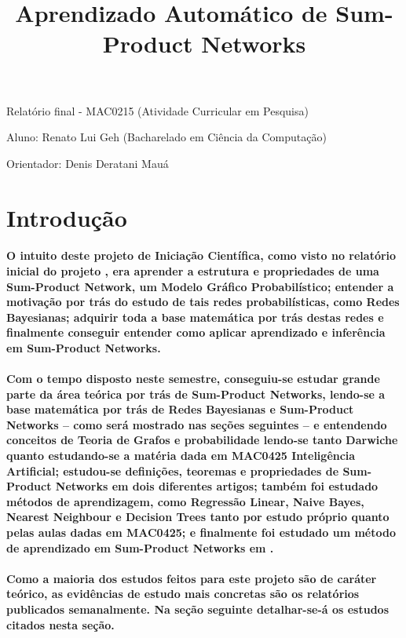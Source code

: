 \documentclass[a4paper,10pt]{article}
\title{\textbf{Aprendizado Automático de Sum-Product Networks}}
\theoremstyle{plain}
\begin{document}
\date{}
\author{}
\vspace*{-40pt}
{\let\newpage\relax\maketitle}

Relatório final - MAC0215 (Atividade Curricular em Pesquisa)

Aluno: Renato Lui Geh (Bacharelado em Ciência da Computação)

Orientador: Denis Deratani Mauá

\section{Introdução}

\paragraph{
  O intuito deste projeto de Iniciação Científica, como visto no relatório inicial do projeto
  \cite{project-def}, era aprender a estrutura e propriedades de uma Sum-Product Network, um Modelo
  Gráfico Probabilístico; entender a motivação por trás do estudo de tais redes probabilísticas,
  como Redes Bayesianas; adquirir toda a base matemática por trás destas redes e finalmente
  conseguir entender como aplicar aprendizado e inferência em Sum-Product Networks.
}

\paragraph{
  Com o tempo disposto neste semestre, conseguiu-se estudar grande parte da área teórica por trás
  de Sum-Product Networks, lendo-se a base matemática por trás de Redes Bayesianas e Sum-Product
  Networks -- como será mostrado nas seções seguintes -- e entendendo conceitos de Teoria de Grafos
  e probabilidade lendo-se tanto Darwiche\cite{bayes-net-darwiche} quanto estudando-se a matéria
  dada em MAC0425 Inteligência Artificial; estudou-se definições, teoremas e propriedades de
  Sum-Product Networks em dois diferentes artigos\cite{poon-domingos}\cite{gens-domingos}; também
  foi estudado métodos de aprendizagem, como Regressão Linear, Naive Bayes, Nearest Neighbour e
  Decision Trees tanto por estudo próprio quanto pelas aulas dadas em MAC0425; e finalmente foi
  estudado um método de aprendizado em Sum-Product Networks em \cite{poon-domingos}.
}

\paragraph{
  Como a maioria dos estudos feitos para este projeto são de caráter teórico, as evidências de
  estudo mais concretas são os relatórios publicados semanalmente. Na seção seguinte detalhar-se-á
  os estudos citados nesta seção.
}
\end{document}
